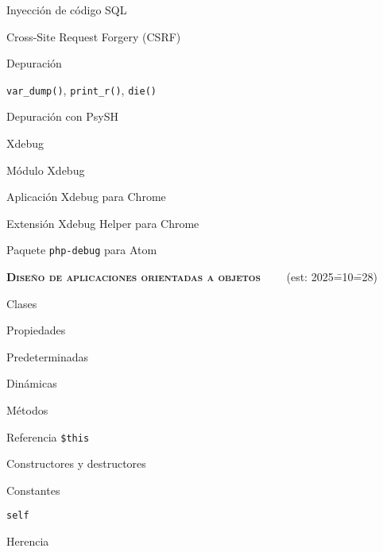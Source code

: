 \begin{longenum}
\begin{longenum}
\begin{longenum}
            \item Inyección de código SQL
            \item Cross-Site Request Forgery (CSRF)
        \end{longenum}
        \item Depuración
        \begin{longenum}
            \item \texttt{var\_dump()}, \texttt{print\_r()}, \texttt{die()}
            \item Depuración con PsySH
            \item Xdebug \opcional\
            \begin{longenum}
                \item Módulo Xdebug
                \item Aplicación Xdebug para Chrome
                \item Extensión Xdebug Helper para Chrome
                \item Paquete \texttt{php-debug} para Atom
            \end{longenum}
        \end{longenum}
    \end{longenum}
    \item \textbf{\textsc{Diseño de aplicaciones orientadas a objetos}} \ \ \ \ (est: 2025\==10\==28)
    \begin{longenum}
        \item Clases
        \item Propiedades
        \begin{longenum}
            \item Predeterminadas
            \item Dinámicas
        \end{longenum}
        \item Métodos
        \begin{longenum}
            \item Referencia \texttt{\$this}
            \item Constructores y destructores
        \end{longenum}
        \item Constantes
        \begin{longenum}
            \item \texttt{self}
        \end{longenum}
        \item Herencia
        \begin{longenum}

\end{longenum}
\end{longenum}
\end{longenum}
